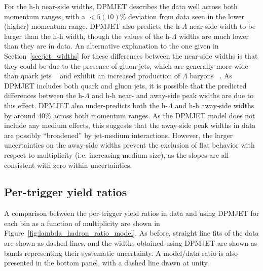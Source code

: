 For the h-h near-side widths, DPMJET describes the data well across both momentum ranges, with a $<5 (10)$\%  deviation from data seen in the lower (higher) momentum range. DPMJET also predicts the h-$\Lambda$ near-side width to be larger than the h-h width, though the values of the h-$\Lambda$ widths are much lower than they are in data. An alternative explanation to the one given in Section~\ref{sec:jet_widths} for these differences between the near-side widths is that they could be due to the presence of gluon jets, which are generally more wide than quark jets ~\cite{GluonJet1} and exhibit an increased production of $\Lambda$ baryons ~\cite{GluonJet2}. As DPMJET includes both quark and gluon jets, it is possible that the predicted differences between the h-$\Lambda$ and h-h near- and away-side peak widths are due to this effect. DPMJET also under-predicts both the h-$\Lambda$ and h-h away-side widths by around 40\% across both momentum ranges. As the DPMJET model does not include any medium effects, this suggests that the away-side peak widths in data are possibly ``broadened'' by jet-medium interactions. However, the larger uncertainties on the away-side widths prevent the exclusion of flat behavior with respect to multiplicity (i.e. increasing medium size), as the slopes are all consistent with zero within uncertainties.

\subsection{Per-trigger yield ratios}
\label{sec:ratios_modelcomp}

 A comparison between the per-trigger yield ratios in data and using DPMJET for each \pt bin as a function of multiplicity are shown in Figure~\ref{fig:lambda_hadron_ratio_model}. As before, straight line fits of the data are shown as dashed lines, and the widths obtained using DPMJET are shown as bands representing their systematic uncertainty. A model/data ratio is also presented in the bottom panel, with a dashed line drawn at unity.

